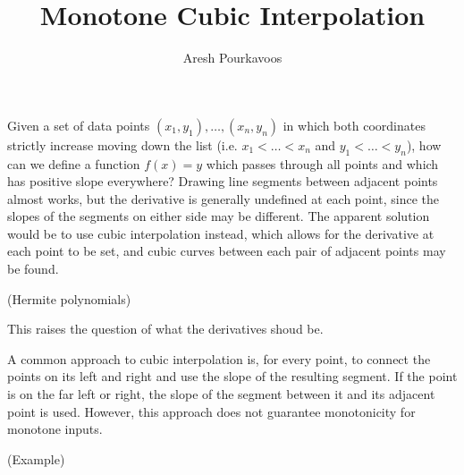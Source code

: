 \documentclass{article}
\begin{document}
\title{Monotone Cubic Interpolation}
\author{Aresh Pourkavoos}
\maketitle

Given a set of data points $(x_1, y_1), \ldots, (x_n, y_n)$
in which both coordinates strictly increase moving down the list
(i.e. $x_1 < \ldots < x_n$ and $y_1 < \ldots < y_n$),
how can we define a function $f(x) = y$ which passes through all points
and which has positive slope everywhere?
Drawing line segments between adjacent points almost works,
but the derivative is generally undefined at each point,
since the slopes of the segments on either side may be different.
The apparent solution would be to use cubic interpolation instead,
which allows for the derivative at each point to be set,
and cubic curves between each pair of adjacent points may be found.

(Hermite polynomials)

This raises the question of what the derivatives shoud be.

A common approach to cubic interpolation
is, for every point,
to connect the points on its left and right
and use the slope of the resulting segment.
If the point is on the far left or right,
the slope of the segment between it and its adjacent point is used.
However, this approach does not guarantee monotonicity for monotone inputs.

(Example)
\end{document}

